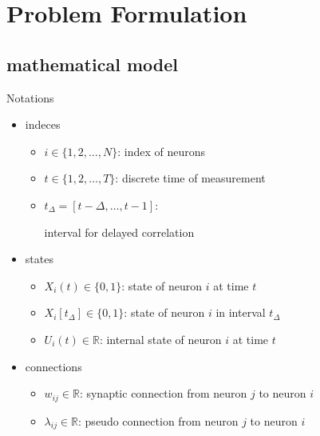\documentclass[fleqn,aspectratio=1610]{beamer}
\begin{document}
\section{Problem Formulation}
\label{sec:org4de4c08}
\subsection{mathematical model}
\label{sec:org2a8d085}
\begin{frame}[label={sec:org42567d6}]{Notations}
\begin{itemize}
\item indeces
\begin{itemize}
\item \(i\in\{1,2,\dotsc,N\}\):
index of neurons
\item \(t\in\{1,2,\dotsc,T\}\):
discrete time of measurement
\item \(t_{\Delta}=[t-\Delta,\dotsc,t-1]\):

interval for delayed correlation
\end{itemize}
\item states
\begin{itemize}
\item \(X_{i}(t)\in\{0,1\}\):
state of neuron \(i\) at time \(t\)
\item \(X_{i}[t_{\Delta}]\in\{0,1\}\):
state of neuron \(i\) in interval \(t_{\Delta}\)
\item \(U_{i}(t)\in\mathbb{R}\):
internal state of neuron \(i\) at time \(t\)
\end{itemize}
\item connections
\begin{itemize}
\item \(w_{ij}\in\mathbb{R}\):
synaptic connection from neuron \(j\) to neuron \(i\)
\item \(\lambda_{ij}\in\mathbb{R}\):
pseudo connection from neuron \(j\) to neuron \(i\)
\end{itemize}
\end{itemize}
\end{frame}
\end{document}
